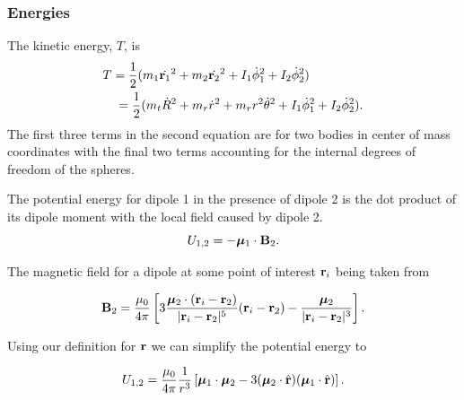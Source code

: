 \documentclass[prbg,preprint]{revtex4-1}
\newcommand{\cvec}[1]{{\rm{\bf{#1}}}}
\begin{document}
\subsubsection{Energies}
The kinetic energy, $T$, is \cite{taylor2005classical}
\begin{equation}
	\begin{multlined}
            T = 
            \frac{1}{2}(
            	m_1 \dot {\cvec{r}_1}^2
            	+m_2 \dot {\cvec{r}_2}^2
            	+ I_1 \dot \phi_1^2
            	+ I_2 \dot \phi_2^2
            )
            \\
            =\frac{1}{2}(
            	m_t \dot R^2
            	+m_r \dot r^2
            	+m_r r^2 \dot \theta^2
            	+ I_1 \dot \phi_1^2
            	+ I_2 \dot \phi_2^2
).
  \end{multlined}
\end{equation}
The first three terms in the second equation are for two bodies in center of mass coordinates with the final two terms accounting for the internal degrees of freedom of the spheres. 

The potential energy for dipole 1 in the presence of dipole 2 is the dot product of its dipole moment with the local field \cite{Edwards:2017aa} caused by dipole 2.
\begin{equation}
U_{1,2} = -\boldsymbol \mu_1 \cdot \cvec B_2.
\end{equation}

The magnetic field for a dipole at some point of interest $\cvec r_i$ being taken from \cite{griffiths2013introduction}

\begin{equation}
\cvec B_2 = 
\frac{\mu_0}{4\pi}\left[
	3\frac{\boldsymbol \mu_2 \cdot (\cvec r_i - \cvec r_2)}{|\cvec r_i - \cvec r_2|^5}(
	\cvec r_i - \cvec r_2
	)
	-\frac{\boldsymbol \mu_2}{|\cvec r_i - \cvec r_2|^3}
\right].
\end{equation}

Using our definition for $\cvec r$ we can simplify the potential energy to

\begin{equation}
U_{1,2} = 
\frac{\mu_0}{4\pi}
\frac{1}{r^3}\left[
	\boldsymbol \mu_1 \cdot \boldsymbol \mu_2
	-3(
		\boldsymbol \mu_2 \cdot \hat {\cvec r}
		)(
		\boldsymbol \mu_1 \cdot \hat {\cvec r}		
		)
\right].
\end{equation}
\end{document}
